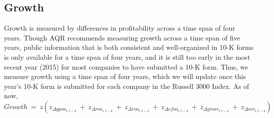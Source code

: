 \documentclass[titlepage]{article}
\begin{document}
\subsection*{Growth}
Growth is measured by differences in profitability across a time span of four years. Though AQR recommends measuring growth across a time span of five years, public information that is both consistent and well-organized in 10-K forms is only available for a time span of four years, and it is still too early in the most recent year (2015) for most companies to have submitted a 10-K form. Thus, we measure growth using a time span of four years, which we will update once this year's 10-K form is submitted for each company in the Russell 3000 Index. As of now, $$Growth \ = \ z(z_{\Delta gpoa_{t,t-4}} \ + \ z_{\Delta roe_{t,t-4}} \ + \ z_{\Delta roa_{t,t-4}} \ + \ z_{\Delta cfoa_{t,t-4}} \ + \ z_{\Delta gmar_{t,t-4}} \ + \ z_{\Delta acc_{t,t-4}})$$
\end{document}
